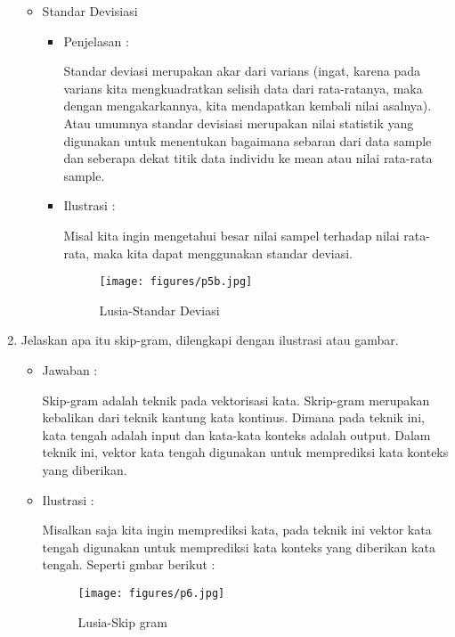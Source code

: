 \begin{enumerate}
\begin{itemize}
	\item Standar Devisiasi
		\begin{itemize}
		\item Penjelasan :
			\par Standar deviasi merupakan akar dari varians (ingat, karena pada varians kita mengkuadratkan selisih data dari rata-ratanya, maka dengan mengakarkannya, kita mendapatkan kembali nilai asalnya). Atau umumnya standar devisiasi merupakan nilai statistik yang digunakan untuk menentukan bagaimana sebaran dari data sample dan seberapa dekat titik data individu ke mean atau nilai rata-rata sample.
			
		\item Ilustrasi :
			\par Misal kita ingin mengetahui besar nilai sampel terhadap nilai rata-rata, maka kita dapat menggunakan standar deviasi.
			\begin{figure}[ht]
			\centering
			\texttt{[image: figures/p5b.jpg]}
			\caption{Lusia-Standar Deviasi}
			\label{contoh}
			\end{figure}
		\end{itemize}
		
	\end{itemize}

\item Jelaskan apa itu skip-gram, dilengkapi dengan ilustrasi atau gambar.
	\begin{itemize}
	\item Jawaban :
		\par Skip-gram adalah teknik pada vektorisasi kata. Skrip-gram merupakan kebalikan dari teknik kantung kata kontinus. Dimana pada teknik ini, kata tengah adalah input dan kata-kata konteks adalah output. Dalam teknik ini, vektor kata tengah digunakan untuk memprediksi kata konteks yang diberikan. 

	\item Ilustrasi :
		\par Misalkan saja kita ingin memprediksi kata, pada teknik ini vektor kata tengah digunakan untuk memprediksi kata konteks yang diberikan kata tengah. Seperti gmbar berikut :
			\begin{figure}[ht]
			\centering
			\texttt{[image: figures/p6.jpg]}
			\caption{Lusia-Skip gram}
			\label{contoh}
			\end{figure}
	
	\end{itemize}

\end{enumerate}



